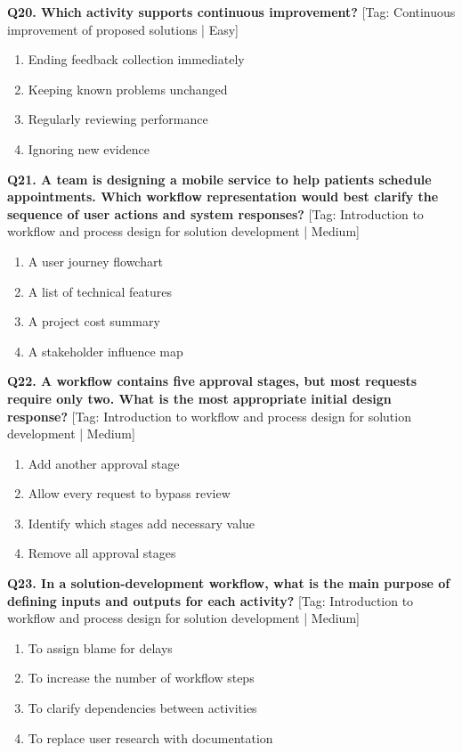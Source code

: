 \noindent\textbf{Q20. Which activity supports continuous improvement?} \hfill [Tag: Continuous improvement of proposed solutions | Easy]
\begin{enumerate}[label=(\alph*),topsep=2pt,itemsep=1pt,partopsep=0pt,parsep=0pt]
    \item {Ending feedback collection immediately}
    \item {Keeping known problems unchanged}
    \item {Regularly reviewing performance}
    \item {Ignoring new evidence}
\end{enumerate}
\vspace{2mm}

\noindent\textbf{Q21. A team is designing a mobile service to help patients schedule appointments. Which workflow representation would best clarify the sequence of user actions and system responses?} \hfill [Tag: Introduction to workflow and process design for solution development | Medium]
\begin{enumerate}[label=(\alph*),topsep=2pt,itemsep=1pt,partopsep=0pt,parsep=0pt]
    \item {A user journey flowchart}
    \item {A list of technical features}
    \item {A project cost summary}
    \item {A stakeholder influence map}
\end{enumerate}
\vspace{2mm}

\noindent\textbf{Q22. A workflow contains five approval stages, but most requests require only two. What is the most appropriate initial design response?} \hfill [Tag: Introduction to workflow and process design for solution development | Medium]
\begin{enumerate}[label=(\alph*),topsep=2pt,itemsep=1pt,partopsep=0pt,parsep=0pt]
    \item {Add another approval stage}
    \item {Allow every request to bypass review}
    \item {Identify which stages add necessary value}
    \item {Remove all approval stages}
\end{enumerate}
\vspace{2mm}

\noindent\textbf{Q23. In a solution-development workflow, what is the main purpose of defining inputs and outputs for each activity?} \hfill [Tag: Introduction to workflow and process design for solution development | Medium]
\begin{enumerate}[label=(\alph*),topsep=2pt,itemsep=1pt,partopsep=0pt,parsep=0pt]
    \item {To assign blame for delays}
    \item {To increase the number of workflow steps}
    \item {To clarify dependencies between activities}
    \item {To replace user research with documentation}
\end{enumerate}
\vspace{2mm}

